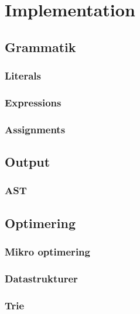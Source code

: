 \section{Implementation}

\subsection{Grammatik}
\subsubsection{Literals}
\subsubsection{Expressions}
\subsubsection{Assignments}

\subsection{Output}
\subsubsection{AST}

\subsection{Optimering}
\subsubsection{Mikro optimering}
\subsubsection{Datastrukturer}
\subsubsection{Trie}

